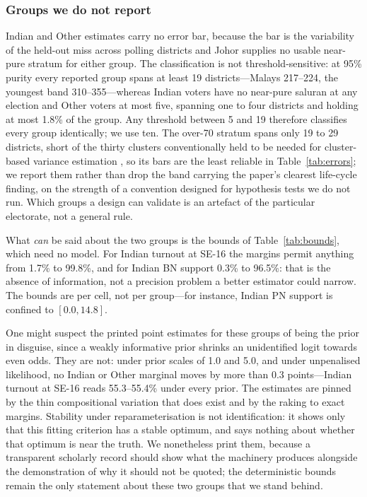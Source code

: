 \documentclass[11pt]{article}
\begin{document}
\subsubsection*{Groups we do not report}

Indian and Other estimates carry no error bar, because the bar is the variability of the held-out miss across polling districts and Johor supplies no usable near-pure stratum for either group. The classification is not threshold-sensitive: at 95\% purity every reported group spans at least 19 districts---Malays 217--224, the youngest band 310--355---whereas Indian voters have no near-pure saluran at any election and Other voters at most five, spanning one to four districts and holding at most 1.8\% of the group. Any threshold between 5 and 19 therefore classifies every group identically; we use ten. The over-70 stratum spans only 19 to 29 districts, short of the thirty clusters conventionally held to be needed for cluster-based variance estimation \cite{cameronmiller2015,cameronetal2008}, so its bars are the least reliable in Table~\ref{tab:errors}; we report them rather than drop the band carrying the paper's clearest life-cycle finding, on the strength of a convention designed for hypothesis tests we do not run. Which groups a design can validate is an artefact of the particular electorate, not a general rule.

What \emph{can} be said about the two groups is the bounds of Table~\ref{tab:bounds}, which need no model. For Indian turnout at SE-16 the margins permit anything from 1.7\% to 99.8\%, and for Indian BN support 0.3\% to 96.5\%: that is the absence of information, not a precision problem a better estimator could narrow. The bounds are per cell, not per group---for instance, Indian PN support is confined to $[0.0, 14.8]$.

One might suspect the printed point estimates for these groups of being the prior in disguise, since a weakly informative prior shrinks an unidentified logit towards even odds. They are not: under prior scales of 1.0 and 5.0, and under unpenalised likelihood, no Indian or Other marginal moves by more than 0.3 points---Indian turnout at SE-16 reads 55.3--55.4\% under every prior. The estimates are pinned by the thin compositional variation that does exist and by the raking to exact margins. Stability under reparameterisation is not identification: it shows only that this fitting criterion has a stable optimum, and says nothing about whether that optimum is near the truth. We nonetheless print them, because a transparent scholarly record should show what the machinery produces alongside the demonstration of why it should not be quoted; the deterministic bounds remain the only statement about these two groups that we stand behind.
\end{document}
